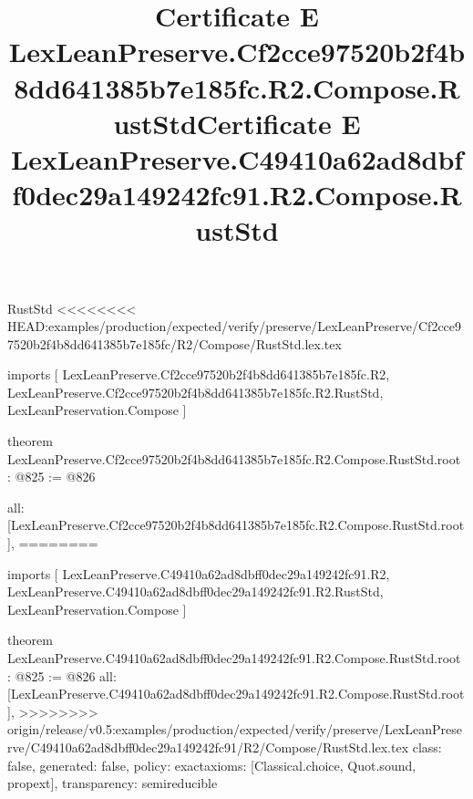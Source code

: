 \begin{lexlean}{RustStd}
<<<<<<<< HEAD:examples/production/expected/verify/preserve/LexLeanPreserve/Cf2cce97520b2f4b8dd641385b7e185fc/R2/Compose/RustStd.lex.tex
\title{Certificate E LexLeanPreserve.Cf2cce97520b2f4b8dd641385b7e185fc.R2.Compose.RustStd}
\begin{coremodule}
imports [
  LexLeanPreserve.Cf2cce97520b2f4b8dd641385b7e185fc.R2,
  LexLeanPreserve.Cf2cce97520b2f4b8dd641385b7e185fc.R2.RustStd,
  LexLeanPreservation.Compose
]

theorem LexLeanPreserve.Cf2cce97520b2f4b8dd641385b7e185fc.R2.Compose.RustStd.root : @825 := @826 {
  all: [LexLeanPreserve.Cf2cce97520b2f4b8dd641385b7e185fc.R2.Compose.RustStd.root],
========
\title{Certificate E LexLeanPreserve.C49410a62ad8dbff0dec29a149242fc91.R2.Compose.RustStd}
\begin{coremodule}
imports [
  LexLeanPreserve.C49410a62ad8dbff0dec29a149242fc91.R2,
  LexLeanPreserve.C49410a62ad8dbff0dec29a149242fc91.R2.RustStd,
  LexLeanPreservation.Compose
]

theorem LexLeanPreserve.C49410a62ad8dbff0dec29a149242fc91.R2.Compose.RustStd.root : @825 := @826 {
  all: [LexLeanPreserve.C49410a62ad8dbff0dec29a149242fc91.R2.Compose.RustStd.root],
>>>>>>>> origin/release/v0.5:examples/production/expected/verify/preserve/LexLeanPreserve/C49410a62ad8dbff0dec29a149242fc91/R2/Compose/RustStd.lex.tex
  class: false,
  generated: false,
  policy: exact{axioms: [Classical.choice, Quot.sound, propext]},
  transparency: semireducible
}


\end{coremodule}}
\end{coremodule}
\end{lexlean}
